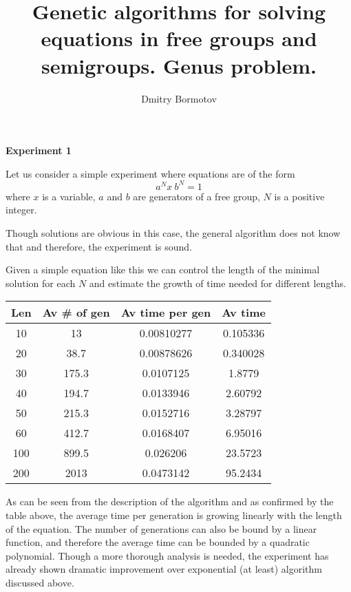 \documentclass[12pt]{slides}
\title{Genetic algorithms for solving
equations in free groups and semigroups.  Genus problem.}
\author{Dmitry Bormotov} \date{}
\begin{document}
\pagestyle{empty}

\vspace{5mm}
\begin{center} \Large\textbf{Experiment 1} \end{center}

Let us consider a simple experiment where equations are of the form
\[
a^N x \: b^N = 1
\]
where $x$ is a variable, $a$ and $b$ are generators of a free group,
$N$ is a positive integer. 

Though solutions are obvious in this case,
the general algorithm does not know that and therefore, the experiment
is sound. 

Given a simple equation like this we can control the length
of the minimal solution for each $N$ and estimate the growth of time
needed for different lengths. 


\newpage

\noindent
\begin{tabular}{|c|c|c|c|} \hline
Len & Av \# of gen & Av time per gen & Av time \\ 
\hline
10 & 13 & 0.00810277 & 0.105336 \\ \hline
20 & 38.7 & 0.00878626 & 0.340028 \\ \hline
30 & 175.3 & 0.0107125 & 1.8779 \\ \hline
40 & 194.7 & 0.0133946 & 2.60792 \\ \hline
50 & 215.3 & 0.0152716 & 3.28797 \\ \hline
60 & 412.7 & 0.0168407 & 6.95016 \\ \hline
100 & 899.5 & 0.026206 & 23.5723 \\ \hline
200 & 2013 & 0.0473142 & 95.2434 \\ \hline
\end{tabular}

As can be seen from the description of the algorithm and as confirmed
by the table above, the average time per generation is growing
linearly with the length of the equation. The number of generations
can also be bound by a linear function, and therefore the average
time can be bounded by a quadratic polynomial. Though a more thorough
analysis is needed, the experiment has already shown dramatic
improvement over exponential (at least) algorithm discussed above.
\end{document}
